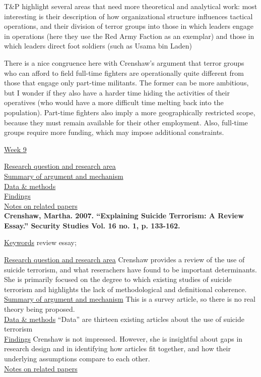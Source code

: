 \documentclass{article}[12pt]
\begin{document}
T\&P highlight several areas that need more theoretical and analytical work:  most interesting is their description of how organizational structure influences tactical operations, and their division of terror groups into those in which leaders engage in operations (here they use the Red Army Faction as an  exemplar) and those in which leaders direct foot soldiers (such as Usama bin Laden)

There is a nice congruence here with Crenshaw’s argument that terror groups who can afford to field full-time fighters are operationally quite different from those that engage only part-time militants. The former can be more ambitious, but I wonder if they also have a harder time hiding the activities of their operatives (who would have a more difficult time melting back into the population).  Part-time fighters also imply a more geographically restricted 
scope, because they must remain available for their other employment. Also, full-time groups require more funding, which may impose additional constraints.

\underline{Week 9}

\underline{Research question and research area}\\
\underline{Summary of argument and mechanism}\\
\underline{Data \& methods}\\
\underline{Findings}\\
\underline{Notes on related papers}\\

\textbf{Crenshaw, Martha. 2007. “Explaining Suicide Terrorism: A Review Essay.” Security Studies Vol. 16 no. 1, p. 133-162.}

\underline{Keywords} review essay; 

\underline{Research question and research area} Crenshaw provides a review of the use of suicide terrorism, and what reserachers have found to be important determinants. She is primarily focused on the degree to which existing studies of suicide terrorism and  highlights the lack of methodological and definitional coherence.\\
\underline{Summary of argument and mechanism} This is a survey article, so there is no real theory being proposed.\\
\underline{Data \& methods} ``Data'' are thirteen existing articles about the use of suicide terrorism \\
\underline{Findings} Crenshaw is not impressed. However, she is insightful about gaps in research design and in identifying how articles fit together, and how their underlying assumptions compare to each other.\\
\underline{Notes on related papers}\\
\end{document}
